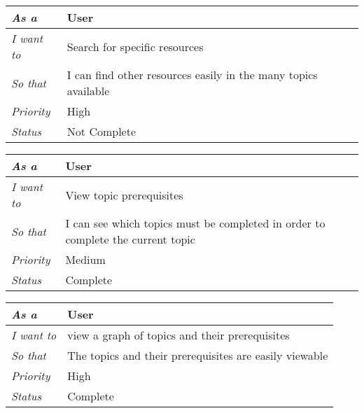\begin{table}[h!]
\begin{tabular}{|l|l|}
\hline
\textit{As a}      & User                                                           \\ \hline
\textit{I want to} & Search for specific resources                                  \\ \hline
\textit{So that}   & I can find other resources easily in the many topics available \\ \hline
\textit{Priority}  & {\color[HTML]{FE0000} High}                                    \\ \hline
\textit{Status}    & Not Complete                                                   \\ \hline          
\end{tabular}
\end{table}

\begin{table}[h!]
\begin{tabular}{|l|l|}
\hline
\textit{As a}      & User                                                                            \\ \hline
\textit{I want to} & View topic prerequisites                                                        \\ \hline
\textit{So that}   & I can see which topics must be completed in order to complete the current topic \\ \hline
\textit{Priority}  & {\color[HTML]{FE996B} Medium}                                                     \\ \hline
\textit{Status}    & Complete                                                                        \\ \hline                              
\end{tabular}
\end{table}

\begin{table}[h!]
\begin{tabular}{|l|l|}
\hline
\textit{As a}      & User                                                   \\ \hline
\textit{I want to} & view a graph of topics and their prerequisites         \\ \hline
\textit{So that}   & The topics and their prerequisites are easily viewable \\ \hline
\textit{Priority}  & {\color[HTML]{FE0000} High}                            \\ \hline
\textit{Status}    & Complete                                               \\ \hline      
\end{tabular}
\end{table}


